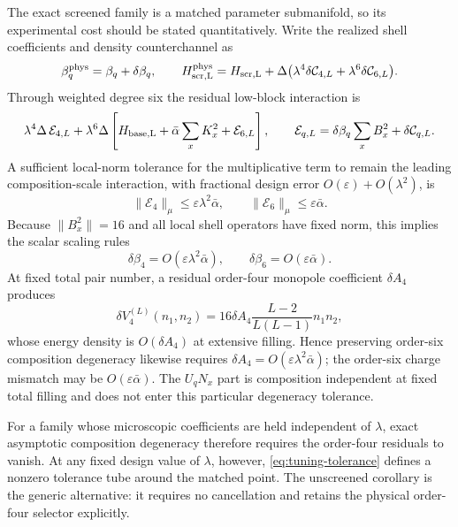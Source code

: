\documentclass[11pt]{article}
\theoremstyle{definition}
\theoremstyle{remark}
\newcommand{\cE}{\mathcal E}
\newcommand{\cC}{\mathcal C}
\newcommand{\norm}[1]{\lVert #1\rVert}
\begin{document}
The exact screened family is a matched parameter submanifold, so its experimental cost should be stated quantitatively.  Write the realized shell coefficients and density counterchannel as
\begin{equation}
 \beta_q^{\rm phys}=\beta_q+\delta\beta_q,
 \qquad
 H_{\rm scr,L}^{\rm phys}=H_{\rm scr,L}
 +\Delta\bigl(\lambda^4\delta\cC_{4,L}+\lambda^6\delta\cC_{6,L}\bigr).
\end{equation}
Through weighted degree six the residual low-block interaction is
\begin{equation}
 \lambda^4\Delta\,\cE_{4,L}
 +\lambda^6\Delta\left[H_{\rm base,L}+\bar\alpha\sum_xK_x^2+\cE_{6,L}\right],
 \qquad
 \cE_{q,L}=\delta\beta_q\sum_xB_x^2+\delta\cC_{q,L}.
 \label{eq:mismatch-effective}
\end{equation}
A sufficient local-norm tolerance for the multiplicative term to remain the leading composition-scale interaction, with fractional design error $O(\varepsilon)+O(\lambda^2)$, is
\begin{equation}
 \boxed{
 \norm{\cE_{4}}_\mu\le \varepsilon\lambda^2\bar\alpha,
 \qquad
 \norm{\cE_{6}}_\mu\le \varepsilon\bar\alpha.}
 \label{eq:tuning-tolerance}
\end{equation}
Because $\norm{B_x^2}=16$ and all local shell operators have fixed norm, this implies the scalar scaling rules
\begin{equation}
 \delta\beta_4=O(\varepsilon\lambda^2\bar\alpha),
 \qquad
 \delta\beta_6=O(\varepsilon\bar\alpha).
 \label{eq:beta-tolerances}
\end{equation}
At fixed total pair number, a residual order-four monopole coefficient $\delta A_4$ produces
\begin{equation}
 \delta V_4^{(L)}(n_1,n_2)
 =16\delta A_4\frac{L-2}{L(L-1)}n_1n_2,
\end{equation}
whose energy density is $O(\delta A_4)$ at extensive filling.  Hence preserving order-six composition degeneracy likewise requires $\delta A_4=O(\varepsilon\lambda^2\bar\alpha)$; the order-six charge mismatch may be $O(\varepsilon\bar\alpha)$.  The $U_qN_x$ part is composition independent at fixed total filling and does not enter this particular degeneracy tolerance.

For a family whose microscopic coefficients are held independent of $\lambda$, exact asymptotic composition degeneracy therefore requires the order-four residuals to vanish.  At any fixed design value of $\lambda$, however, \eqref{eq:tuning-tolerance} defines a nonzero tolerance tube around the matched point.  The unscreened corollary is the generic alternative: it requires no cancellation and retains the physical order-four selector explicitly.
\end{document}
